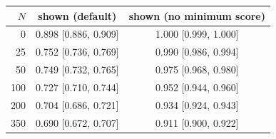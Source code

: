 \begin{tabular}{rcc}
\toprule
$N$ & shown (default) & shown (no minimum score) \\
\midrule
0 & 0.898 [0.886, 0.909] & 1.000 [0.999, 1.000] \\
25 & 0.752 [0.736, 0.769] & 0.990 [0.986, 0.994] \\
50 & 0.749 [0.732, 0.765] & 0.975 [0.968, 0.980] \\
100 & 0.727 [0.710, 0.744] & 0.952 [0.944, 0.960] \\
200 & 0.704 [0.686, 0.721] & 0.934 [0.924, 0.943] \\
350 & 0.690 [0.672, 0.707] & 0.911 [0.900, 0.922] \\
\bottomrule
\end{tabular}
